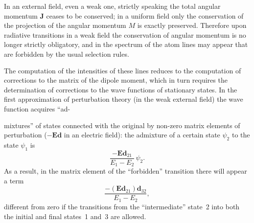 In an external field, even a weak one, strictly speaking the total angular momentum $\mathbf{J}$ ceases to be conserved; in a uniform field only the conservation of the projection of the angular momentum $M$ is exactly preserved. Therefore upon radiative transitions in a weak field the conservation of angular momentum is no longer strictly obligatory, and in the spectrum of the atom lines may appear that are forbidden by the usual selection rules.

The computation of the intensities of these lines reduces to the computation of corrections to the matrix of the dipole moment, which in turn requires the determination of corrections to the wave functions of stationary states. In the first approximation of perturbation theory (in the weak external field) the wave function acquires ``ad-

mixtures'' of states connected with the original by non-zero matrix elements of perturbation ($-\mathbf{E}\mathbf{d}$ in an electric field): the admixture of a certain state $\psi_2$ to the state $\psi_1$ is
\[
\frac{-\mathbf{E}\mathbf{d}_{21}}{E_1 - E_2}\,\psi_2.
\]
As a result, in the matrix element of the ``forbidden'' transition there will appear a term
\[
\frac{-(\mathbf{E}\mathbf{d}_{21})\mathbf{d}_{32}}{E_1 - E_2},
\]
different from zero if the transitions from the ``intermediate'' state~2 into both the initial and final states~1 and~3 are allowed.